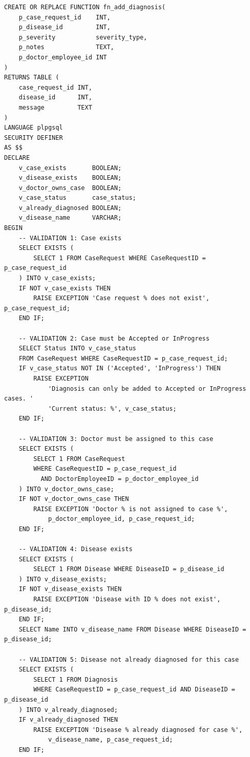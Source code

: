 \documentclass{article}
\begin{document}
\begin{lstlisting}
CREATE OR REPLACE FUNCTION fn_add_diagnosis(
    p_case_request_id    INT,
    p_disease_id         INT,
    p_severity           severity_type,
    p_notes              TEXT,
    p_doctor_employee_id INT
)
RETURNS TABLE (
    case_request_id INT,
    disease_id      INT,
    message         TEXT
)
LANGUAGE plpgsql
SECURITY DEFINER
AS $$
DECLARE
    v_case_exists       BOOLEAN;
    v_disease_exists    BOOLEAN;
    v_doctor_owns_case  BOOLEAN;
    v_case_status       case_status;
    v_already_diagnosed BOOLEAN;
    v_disease_name      VARCHAR;
BEGIN
    -- VALIDATION 1: Case exists
    SELECT EXISTS (
        SELECT 1 FROM CaseRequest WHERE CaseRequestID = p_case_request_id
    ) INTO v_case_exists;
    IF NOT v_case_exists THEN
        RAISE EXCEPTION 'Case request % does not exist', p_case_request_id;
    END IF;

    -- VALIDATION 2: Case must be Accepted or InProgress
    SELECT Status INTO v_case_status
    FROM CaseRequest WHERE CaseRequestID = p_case_request_id;
    IF v_case_status NOT IN ('Accepted', 'InProgress') THEN
        RAISE EXCEPTION
            'Diagnosis can only be added to Accepted or InProgress cases. '
            'Current status: %', v_case_status;
    END IF;

    -- VALIDATION 3: Doctor must be assigned to this case
    SELECT EXISTS (
        SELECT 1 FROM CaseRequest
        WHERE CaseRequestID = p_case_request_id
          AND DoctorEmployeeID = p_doctor_employee_id
    ) INTO v_doctor_owns_case;
    IF NOT v_doctor_owns_case THEN
        RAISE EXCEPTION 'Doctor % is not assigned to case %',
            p_doctor_employee_id, p_case_request_id;
    END IF;

    -- VALIDATION 4: Disease exists
    SELECT EXISTS (
        SELECT 1 FROM Disease WHERE DiseaseID = p_disease_id
    ) INTO v_disease_exists;
    IF NOT v_disease_exists THEN
        RAISE EXCEPTION 'Disease with ID % does not exist', p_disease_id;
    END IF;
    SELECT Name INTO v_disease_name FROM Disease WHERE DiseaseID = p_disease_id;

    -- VALIDATION 5: Disease not already diagnosed for this case
    SELECT EXISTS (
        SELECT 1 FROM Diagnosis
        WHERE CaseRequestID = p_case_request_id AND DiseaseID = p_disease_id
    ) INTO v_already_diagnosed;
    IF v_already_diagnosed THEN
        RAISE EXCEPTION 'Disease % already diagnosed for case %',
            v_disease_name, p_case_request_id;
    END IF;


\end{lstlisting}
\end{document}
